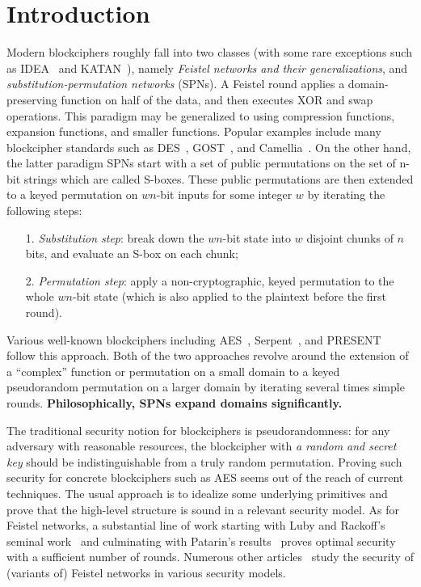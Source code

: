 
\section{Introduction}
\label{section:Introduction}

Modern blockciphers roughly fall into two classes (with some rare exceptions such as IDEA~\cite{EC:LaiMas90} and KATAN~\cite{CHES:DeCDunKne09}), namely {\it Feistel networks and their generalizations}, and {\it substitution-permutation networks} (SPNs). A Feistel round applies a domain-preserving function on half of the data, and then executes XOR and swap operations. This paradigm may be generalized to using compression functions, expansion functions, and smaller functions. Popular examples include many blockcipher standards such as DES~\cite{DESDesign}, GOST~\cite{GOSTDesign}, and Camellia~\cite{ISOIEC-18033-3:2010}. On the other hand, the latter paradigm SPNs start with a set of public permutations on the set of n-bit strings which are called S-boxes. These public permutations are then extended to a keyed permutation on $wn$-bit inputs for some integer $w$ by iterating the following steps:
\begin{enumerate}
	\item[1.] {\it Substitution step}: break down the $wn$-bit state into $w$ disjoint chunks of $n$ bits, and evaluate an S-box on each chunk;
	\item[2.] {\it Permutation step}: apply a non-cryptographic, keyed permutation to the whole $wn$-bit state (which is also applied to the plaintext before the first round).
\end{enumerate}
Various well-known blockciphers including AES~\cite{AESDesign}, Serpent~\cite{serpentProposal}, and PRESENT~\cite{CHES:BKLPPR07} follow this approach. Both of the two approaches revolve around the extension of a ``complex'' function or permutation on a small domain to a keyed pseudorandom permutation on a larger domain by iterating several times simple rounds. {\bf Philosophically, SPNs expand domains significantly.}



The traditional security notion for blockciphers is pseudorandomness: for any adversary with reasonable resources, the blockcipher with {\it a random and secret key} should be indistinguishable from a truly random
permutation. Proving such security for concrete blockciphers such as AES
seems out of the reach of current techniques. The usual approach is to idealize some underlying primitives and prove that the
high-level structure is sound in a relevant security model. As for Feistel networks, a substantial line of work starting with Luby and Rackoff's seminal work~\cite{DBLP:journals/siamcomp/LubyR88}
and culminating with Patarin's results~\cite{C:patarin03} proves optimal security with
a sufficient number of rounds. Numerous other articles~\cite{C:HoaRog10,JC:CHKPST16} study the security of (variants of) Feistel networks in various
security models.





